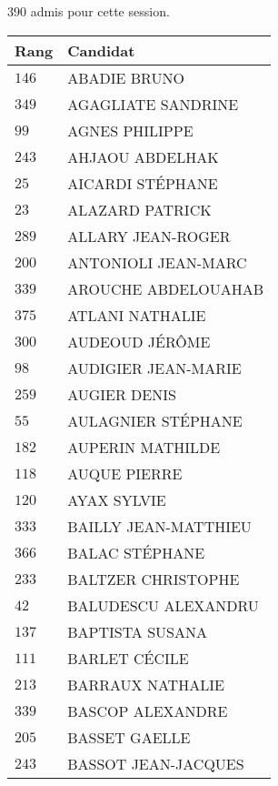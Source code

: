 




  $390$ admis pour cette session.

  \begin{xltabular}{\linewidth}{|l|X|}
    \hline
    \textbf{Rang} & \textbf{Candidat} \\
    \hline
    $146$ & ABADIE BRUNO \\
    \hline
    $349$ & AGAGLIATE SANDRINE \\
    \hline
    $99$ & AGNES PHILIPPE \\
    \hline
    $243$ & AHJAOU ABDELHAK \\
    \hline
    $25$ & AICARDI STÉPHANE \\
    \hline
    $23$ & ALAZARD PATRICK \\
    \hline
    $289$ & ALLARY JEAN-ROGER \\
    \hline
    $200$ & ANTONIOLI JEAN-MARC \\
    \hline
    $339$ & AROUCHE ABDELOUAHAB \\
    \hline
    $375$ & ATLANI NATHALIE \\
    \hline
    $300$ & AUDEOUD JÉRÔME \\
    \hline
    $98$ & AUDIGIER JEAN-MARIE \\
    \hline
    $259$ & AUGIER DENIS \\
    \hline
    $55$ & AULAGNIER STÉPHANE \\
    \hline
    $182$ & AUPERIN MATHILDE \\
    \hline
    $118$ & AUQUE PIERRE \\
    \hline
    $120$ & AYAX SYLVIE \\
    \hline
    $333$ & BAILLY JEAN-MATTHIEU \\
    \hline
    $366$ & BALAC STÉPHANE \\
    \hline
    $233$ & BALTZER CHRISTOPHE \\
    \hline
    $42$ & BALUDESCU ALEXANDRU \\
    \hline
    $137$ & BAPTISTA SUSANA \\
    \hline
    $111$ & BARLET CÉCILE \\
    \hline
    $213$ & BARRAUX NATHALIE \\
    \hline
    $339$ & BASCOP ALEXANDRE \\
    \hline
    $205$ & BASSET GAELLE \\
    \hline
    $243$ & BASSOT JEAN-JACQUES \\

\end{xltabular}
